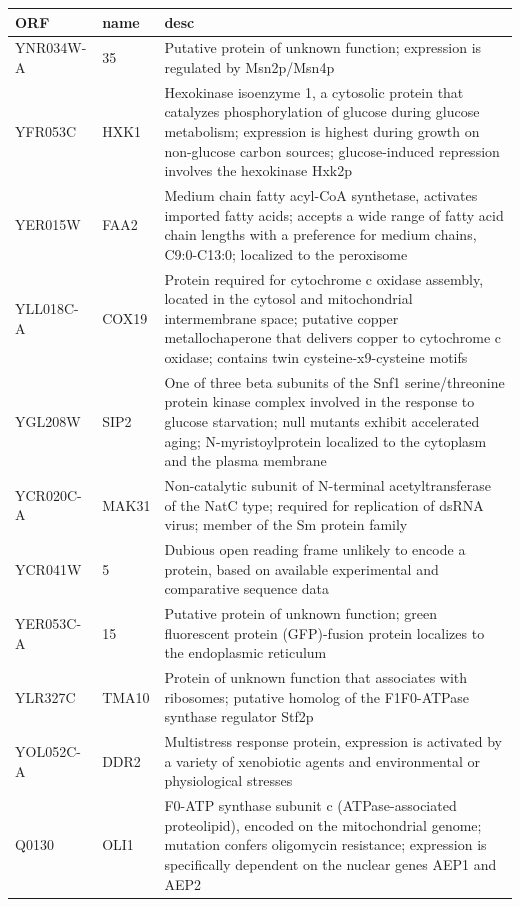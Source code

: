 \documentclass[letter]{article}\usepackage{graphicx, color}
\begin{document}
\begin{longtable}{lll}
  \hline
ORF & name & desc \\ 
  \hline
YNR034W-A & 35 & Putative protein of unknown function; expression is regulated by Msn2p/Msn4p \\ 
  YFR053C & HXK1 & Hexokinase isoenzyme 1, a cytosolic protein that catalyzes phosphorylation of glucose during glucose metabolism; expression is highest during growth on non-glucose carbon sources; glucose-induced repression involves the hexokinase Hxk2p \\ 
  YER015W & FAA2 & Medium chain fatty acyl-CoA synthetase, activates imported fatty acids; accepts a wide range of fatty acid chain lengths with a preference for medium chains, C9:0-C13:0; localized to the peroxisome \\ 
  YLL018C-A & COX19 & Protein required for cytochrome c oxidase assembly, located in the cytosol and mitochondrial intermembrane space; putative copper metallochaperone that delivers copper to cytochrome c oxidase; contains twin cysteine-x9-cysteine motifs \\ 
  YGL208W & SIP2 & One of three beta subunits of the Snf1 serine/threonine protein kinase complex involved in the response to glucose starvation; null mutants exhibit accelerated aging; N-myristoylprotein localized to the cytoplasm and the plasma membrane \\ 
  YCR020C-A & MAK31 & Non-catalytic subunit of N-terminal acetyltransferase of the NatC type; required for replication of dsRNA virus; member of the Sm protein family \\ 
  YCR041W & 5 & Dubious open reading frame unlikely to encode a protein, based on available experimental and comparative sequence data \\ 
  YER053C-A & 15 & Putative protein of unknown function; green fluorescent protein (GFP)-fusion protein localizes to the endoplasmic reticulum \\ 
  YLR327C & TMA10 & Protein of unknown function that associates with ribosomes; putative homolog of the F1F0-ATPase synthase regulator Stf2p \\ 
  YOL052C-A & DDR2 & Multistress response protein, expression is activated by a variety of xenobiotic agents and environmental or physiological stresses \\ 
  Q0130 & OLI1 & F0-ATP synthase subunit c (ATPase-associated proteolipid), encoded on the mitochondrial genome; mutation confers oligomycin resistance; expression is specifically dependent on the nuclear genes AEP1 and AEP2 \\ 

\end{longtable}
\end{document}
